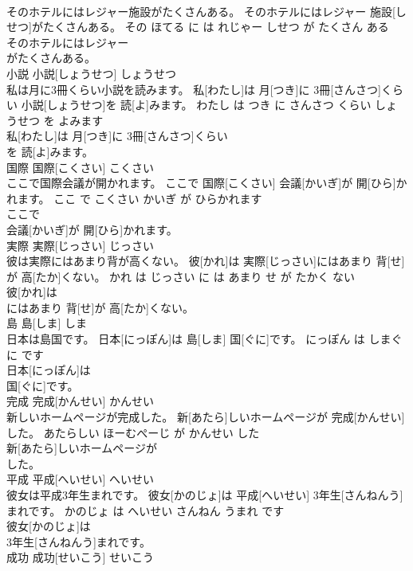 \documentclass[8pt]{extreport}
\begin{document}
\begin{CJK}{UTF8}{min}
\\	そのホテルにはレジャー施設がたくさんある。	そのホテルにはレジャー 施設[しせつ]がたくさんある。	その ほてる に は れじゃー しせつ が たくさん ある	
\\	そのホテルにはレジャー
\\	がたくさんある。			
\\	小説	小説[しょうせつ]	しょうせつ	
\\	私は月に3冊くらい小説を読みます。	私[わたし]は 月[つき]に 3冊[さんさつ]くらい 小説[しょうせつ]を 読[よ]みます。	わたし は つき に さんさつ くらい しょうせつ を よみます	
\\	私[わたし]は 月[つき]に 3冊[さんさつ]くらい
\\	を 読[よ]みます。			
\\	国際	国際[こくさい]	こくさい	
\\	ここで国際会議が開かれます。	ここで 国際[こくさい] 会議[かいぎ]が 開[ひら]かれます。	ここ で こくさい かいぎ が ひらかれます	
\\	ここで
\\	会議[かいぎ]が 開[ひら]かれます。			
\\	実際	実際[じっさい]	じっさい	
\\	彼は実際にはあまり背が高くない。	彼[かれ]は 実際[じっさい]にはあまり 背[せ]が 高[たか]くない。	かれ は じっさい に は あまり せ が たかく ない	
\\	彼[かれ]は
\\	にはあまり 背[せ]が 高[たか]くない。			
\\	島	島[しま]	しま	
\\	日本は島国です。	日本[にっぽん]は 島[しま] 国[ぐに]です。	にっぽん は しまぐに です	
\\	日本[にっぽん]は
\\	国[ぐに]です。			
\\	完成	完成[かんせい]	かんせい	
\\	新しいホームページが完成した。	新[あたら]しいホームページが 完成[かんせい]した。	あたらしい ほーむぺーじ が かんせい した	
\\	新[あたら]しいホームページが
\\	した。			
\\	平成	平成[へいせい]	へいせい	
\\	彼女は平成3年生まれです。	彼女[かのじょ]は 平成[へいせい] 3年生[さんねんう]まれです。	かのじょ は へいせい さんねん うまれ です	
\\	彼女[かのじょ]は
\\	3年生[さんねんう]まれです。			
\\	成功	成功[せいこう]	せいこう	

\end{CJK}
\end{document}
